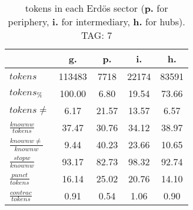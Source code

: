 \begin{table}[h!]
\begin{center}
\begin{tabular}{| l || c | c | c | c |}\hline
 & {\bf g.} & {\bf p.} & {\bf i.} & {\bf h.} \\\hline\hline
$tokens$ & 113483  & 7718  & 22174  & 83591 \\
$tokens_{\%}$ & 100.00  & 6.80  & 19.54  & 73.66 \\
$tokens \neq$ & 6.17  & 21.57  & 13.57  & 6.57 \\\hline
$\frac{knownw}{tokens}$ & 37.47  & 30.76  & 34.12  & 38.97 \\
$\frac{knownw \neq}{knownw}$ & 9.44  & 40.23  & 23.66  & 10.65 \\\hline
$\frac{stopw}{knownw}$ & 93.17  & 82.73  & 98.32  & 92.74 \\
$\frac{punct}{tokens}$ & 16.14  & 25.02  & 20.76  & 14.10 \\
$\frac{contrac}{tokens}$ & 0.91  & 0.54  & 1.06  & 0.90 \\\hline
\end{tabular}
\caption{tokens in each Erd\"os sector ({{\bf p.}} for periphery, {{\bf i.}} for intermediary, 
    {{\bf h.}} for hubs). TAG: 7}
\end{center}
\end{table}